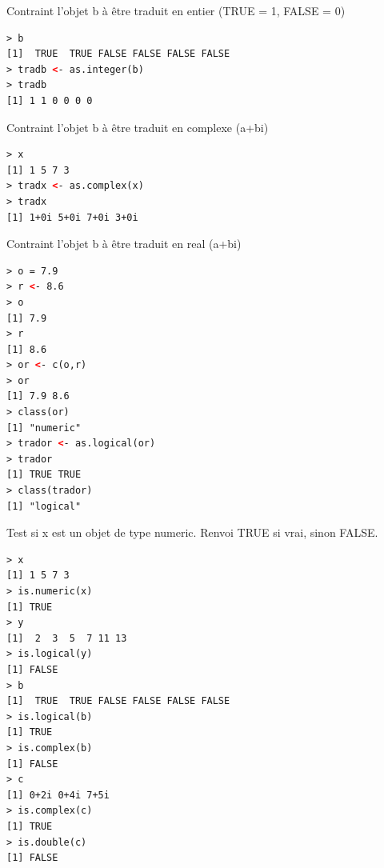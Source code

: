 Contraint l'objet b à être traduit en entier (TRUE = 1, FALSE = 0)
\begin{lstlisting}[language=html]
> b
[1]  TRUE  TRUE FALSE FALSE FALSE FALSE
> tradb <- as.integer(b)
> tradb
[1] 1 1 0 0 0 0
\end{lstlisting}
Contraint l'objet b à être traduit en complexe (a+bi)
\begin{lstlisting}[language=html]
> x
[1] 1 5 7 3
> tradx <- as.complex(x)
> tradx
[1] 1+0i 5+0i 7+0i 3+0i
\end{lstlisting}
Contraint l'objet b à être traduit en real (a+bi)
\begin{lstlisting}[language=html]
> o = 7.9
> r <- 8.6
> o
[1] 7.9
> r
[1] 8.6
> or <- c(o,r)
> or
[1] 7.9 8.6
> class(or)
[1] "numeric"
> trador <- as.logical(or)
> trador
[1] TRUE TRUE
> class(trador)
[1] "logical"
\end{lstlisting}
Test si x est un objet de type numeric. Renvoi TRUE si vrai, sinon FALSE.
\begin{lstlisting}[language=html]
> x
[1] 1 5 7 3
> is.numeric(x)
[1] TRUE
> y
[1]  2  3  5  7 11 13
> is.logical(y)
[1] FALSE
> b
[1]  TRUE  TRUE FALSE FALSE FALSE FALSE
> is.logical(b)
[1] TRUE
> is.complex(b)
[1] FALSE
> c
[1] 0+2i 0+4i 7+5i
> is.complex(c)
[1] TRUE
> is.double(c)
[1] FALSE
\end{lstlisting}

